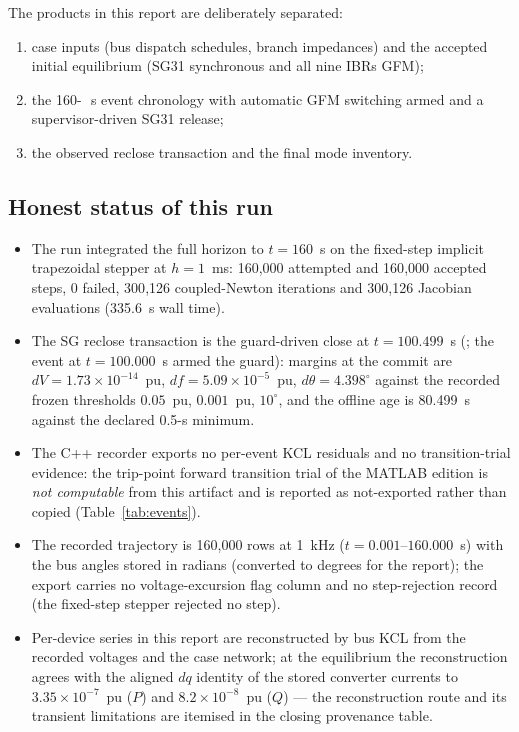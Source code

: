 \documentclass[12pt,a4paper]{article}
\newcommand{\second}{\ifmmode\,\mathrm{s}\else\ s\fi}
\newcommand{\code}[1]{\texttt{\detokenize{#1}}}
\begin{document}
The products in this report are deliberately separated:
\begin{enumerate}
  \item case inputs (bus dispatch schedules, branch impedances) and the accepted
        initial equilibrium (SG31 synchronous and all nine IBRs GFM);
  \item the 160-\second{} event chronology with automatic GFM switching armed and a
        supervisor-driven SG31 release;
  \item the observed reclose transaction and the final mode inventory.
\end{enumerate}

\subsection{Honest status of this run}
\begin{itemize}
\item The run integrated the full horizon to $t=160$~s on the fixed-step
      implicit trapezoidal stepper at $h=1$~ms: 160{,}000 attempted and
      160{,}000 accepted steps, 0 failed, 300{,}126 coupled-Newton iterations
      and 300{,}126 Jacobian evaluations (335.6~s wall time).
\item The SG reclose transaction is the guard-driven close at $t=100.499$~s
      (\code{guard\_reclose.json}; the \code{sg\_on} event at $t=100.000$~s
      armed the guard): margins at the commit are $dV=1.73\times10^{-14}$~pu,
      $df=5.09\times10^{-5}$~pu, $d\theta=4.398^\circ$ against the recorded
      frozen thresholds $0.05$~pu, $0.001$~pu, $10^\circ$, and the offline age
      is 80.499~s against the declared 0.5-s minimum.
\item The C++ recorder exports no per-event KCL residuals and no
      transition-trial evidence: the trip-point forward transition trial of the
      MATLAB edition is \emph{not computable} from this artifact and is
      reported as not-exported rather than copied
      (Table~\ref{tab:events}).
\item The recorded trajectory is 160{,}000 rows at 1~kHz
      ($t=0.001$--$160.000$~s) with the bus angles stored in radians (converted
      to degrees for the report); the export carries no voltage-excursion flag
      column and no step-rejection record (the fixed-step stepper rejected no
      step).
\item Per-device series in this report are reconstructed by bus KCL from the
      recorded voltages and the case network; at the equilibrium the
      reconstruction agrees with the aligned $dq$ identity of the stored
      converter currents to $3.35\times10^{-7}$~pu ($P$) and
      $8.2\times10^{-8}$~pu ($Q$) --- the reconstruction route and its
      transient limitations are itemised in the closing provenance table.
\end{itemize}
\end{document}
